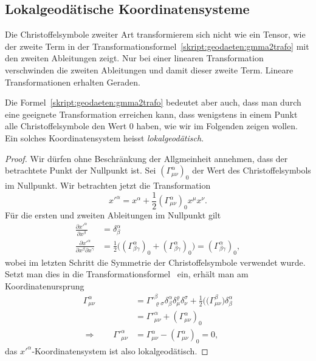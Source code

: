 \subsection{Lokalgeodätische Koordinatensysteme}
Die Christoffelsymbole zweiter Art transformierem sich nicht
wie ein Tensor, wie der zweite Term
in der Transformationsformel~\eqref{skript:geodaeten:gmma2trafo}
mit den zweiten Ableitungen zeigt.
Nur bei einer linearen Transformation verschwinden die zweiten Ableitungen
und damit dieser zweite Term.
Lineare Transformationen erhalten Geraden.

Die Formel~\eqref{skript:geodaeten:gmma2trafo}
bedeutet aber auch, dass man durch eine geeignete Transformation
erreichen kann, dass wenigstens in einem Punkt alle Christoffelsymbole
den Wert $0$ haben, wie wir im Folgenden zeigen wollen.
Ein solches Koordinatensystem heisst {\em lokalgeodätisch}.
%

\begin{proof}
Wir dürfen ohne Beschränkung der Allgmeinheit annehmen, dass der betrachtete
Punkt der Nullpunkt ist.
Sei $(\Gamma^\alpha_{\mu\nu})_0$ der Wert des Christoffelsymbols im
Nullpunkt.
Wir betrachten jetzt die Transformation
\[
x'^\alpha = x^\alpha + \frac12(\Gamma^\alpha_{\mu\nu})_0x^\mu x^\nu.
\]
Für die ersten und zweiten Ableitungen im Nullpunkt gilt
\begin{align*}
\frac{\partial x'^\alpha}{\partial x^\beta}
&=
\delta^\alpha_\beta
\\
\frac{\partial x'^\alpha}{\partial x^\beta\partial x^\gamma}
&=
\frac12\bigl(
(\Gamma^\alpha_{\beta\gamma})_0 + (\Gamma^\alpha_{\beta\gamma})_0
\bigr)
=
(\Gamma^\alpha_{\beta\gamma})_0,
\end{align*}
wobei im letzten Schritt die Symmetrie der Christoffelsymbole verwendet wurde.
Setzt man dies in die
Transformationsformel~\label{skript:kruemmung:christoffeltransformation} ein,
erhält man am Koordinatenursprung
\begin{align*}
\Gamma^\alpha_{\mu\nu}
&=
\Gamma'^\beta_{\varrho\sigma}
\delta^\alpha_\beta
\delta^\varrho_\mu
\delta^\sigma_\nu
+
\frac12\bigl(
(\Gamma^\beta_{\mu\nu}
\bigr)
\delta^\alpha_\beta
\\
&=
\Gamma'^\alpha_{\mu\nu}
+
(\Gamma^\alpha_{\mu\nu})_0
\\
\Rightarrow\qquad
\Gamma'^\alpha_{\mu\nu}
&=
\Gamma^\alpha_{\mu\nu}
-
(\Gamma^\alpha_{\mu\nu})_0
=0,
\end{align*}
das $x'^\alpha$-Koordinatensystem ist also lokalgeodätisch.
\end{proof}

